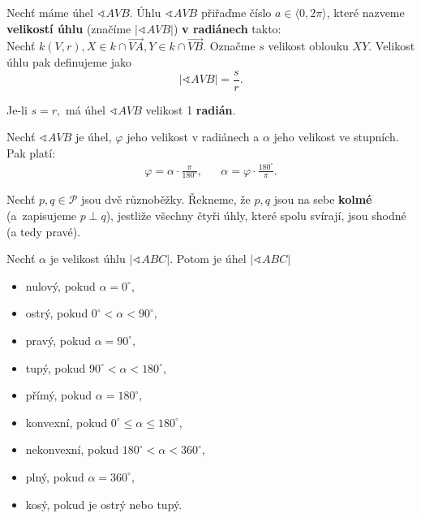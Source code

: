 \begin{definition}\label{raddef}
    Nechť máme úhel $\sphericalangle AVB$. Úhlu $\sphericalangle AVB$ přiřaďme číslo $a\in \langle 0, 2\pi \rangle$,
    které nazveme \textbf{velikostí úhlu} (značíme $|\sphericalangle AVB|$) \textbf{v radiánech} takto:\\
    Nechť $k(V,r), X\in k\cap \overrightarrow{VA}, Y\in k\cap \overrightarrow{VB}.$
    Označme $s$ velikost oblouku $XY.$ Velikost úhlu pak definujeme jako
    $$|\sphericalangle AVB| = \frac{s}{r}.$$
\end{definition}

\begin{pozn}
    Je-li $s=r,$ má úhel $\sphericalangle AVB$ velikost 1 \textbf{radián}.
\end{pozn}

\begin{veta}
    Nechť $\sphericalangle AVB$ je úhel, $\varphi$ jeho velikost v radiánech a $\alpha$
    jeho velikost ve stupních. Pak platí:
    \begin{align*}
        \varphi = \alpha\cdot \frac{\pi}{180^\circ}, & & \alpha = \varphi\cdot \frac{180^\circ}{\pi}.
    \end{align*}
\end{veta}

\begin{definition}
  Nechť $p,q\in \mathscr P$ jsou dvě různoběžky. Řekneme, že $p,q$ jsou na sebe \textbf{kolmé} (a~zapisujeme $p\perp q$), jestliže všechny čtyři úhly, které spolu svírají, jsou shodné (a tedy pravé).
\end{definition}

\begin{pozn}
  Nechť $\alpha$ je velikost úhlu $|\sphericalangle ABC|$. Potom je úhel $|\sphericalangle ABC|$
  \begin{itemize}
    \item nulový, pokud $\alpha=0^\circ$,
  \item ostrý, pokud $0^\circ <\alpha < 90^\circ,$
  \item pravý, pokud $\alpha = 90^\circ,$
  \item tupý, pokud $90^\circ < \alpha < 180^\circ,$
  \item přímý, pokud $\alpha = 180^\circ,$
  \item konvexní, pokud $0^\circ \leq \alpha \leq 180^\circ,$
  \item nekonvexní, pokud $180^\circ < \alpha < 360^\circ$,
  \item plný, pokud $\alpha = 360^\circ,$
  \item kosý, pokud je ostrý nebo tupý.
  \end{itemize}
\end{pozn}

